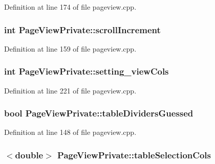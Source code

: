 Definition at line 174 of file pageview.\+cpp.

\hypertarget{classPageViewPrivate_a514156a25a5fc564a7ddabe5d30bcecb}{
\subsubsection[{scroll\+Increment}]{\setlength{\rightskip}{0pt plus 5cm}int Page\+View\+Private\+::scroll\+Increment}}\label{classPageViewPrivate_a514156a25a5fc564a7ddabe5d30bcecb}


Definition at line 159 of file pageview.\+cpp.

\hypertarget{classPageViewPrivate_a21714496870aaec57f163f23a696da48}{
\subsubsection[{setting\+\_\+view\+Cols}]{\setlength{\rightskip}{0pt plus 5cm}int Page\+View\+Private\+::setting\+\_\+view\+Cols}}\label{classPageViewPrivate_a21714496870aaec57f163f23a696da48}


Definition at line 221 of file pageview.\+cpp.

\hypertarget{classPageViewPrivate_a2ceb798d9b9f218e6acc3769d01102f4}{
\subsubsection[{table\+Dividers\+Guessed}]{\setlength{\rightskip}{0pt plus 5cm}bool Page\+View\+Private\+::table\+Dividers\+Guessed}}\label{classPageViewPrivate_a2ceb798d9b9f218e6acc3769d01102f4}


Definition at line 148 of file pageview.\+cpp.

\hypertarget{classPageViewPrivate_a9d6389f129073d1af9973814a2b1d418}{
\subsubsection[{table\+Selection\+Cols}]{$<$double$>$ Page\+View\+Private\+::table\+Selection\+Cols}}\label{classPageViewPrivate_a9d6389f129073d1af9973814a2b1d418}


